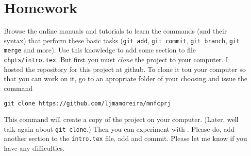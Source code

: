 \section{Homework}
Browse the online \git{} manuals and tutorials to learn the commands (and their
syntax) that perform these basic tasks (\texttt{git add}, \texttt{git commit},
\texttt{git branch}, \texttt{git merge} and more). Use this knowledge to add
some section to file \texttt{chpts/intro.tex}. But first you must \emph{clone}
the project to your computer. I hosted the repository for this project at
github. To clone it tou your computer so that you can work on it, go to an
apropriate folder of your choosing and issue the command

\texttt{git clone https://github.com/ljmamoreira/mnfcprj}

This command will create a copy of the project on your computer. (Later, well
talk again about \texttt{git clone}.) Then you can
experiment with \git. Please do, add another section to the \texttt{intro.tex}
file, add and commit. Please let me know if you have any difficulties.
